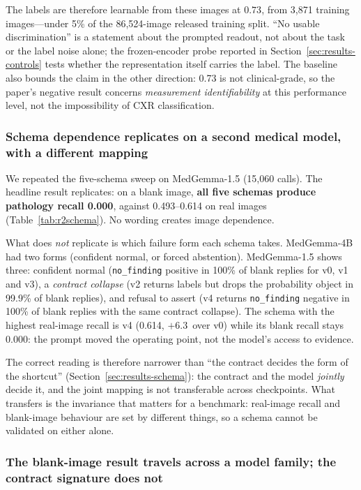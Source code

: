 The labels are therefore learnable from these images at $0.73$, from 3,871 training images---under 5\% of the 86{,}524-image released training split. ``No usable discrimination'' is a statement about the prompted readout, not about the task or the label noise alone; the frozen-encoder probe reported in Section~\ref{sec:results-controls} tests whether the representation itself carries the label. The baseline also bounds the claim in the other direction: 0.73 is not clinical-grade, so the paper's negative result concerns \emph{measurement identifiability} at this performance level, not the impossibility of CXR classification.

\subsubsection{Schema dependence replicates on a second medical model, with a different mapping}
\label{sec:results-schema2}

We repeated the five-schema sweep on MedGemma-1.5 (15,060 calls). The headline result replicates: on a blank image, \textbf{all five schemas produce pathology recall 0.000}, against 0.493--0.614 on real images (Table~\ref{tab:r2schema}). No wording creates image dependence.

What does \emph{not} replicate is which failure form each schema takes. MedGemma-4B had two forms (confident normal, or forced abstention). MedGemma-1.5 shows three: confident normal (\texttt{no\_finding} positive in 100\% of blank replies for v0, v1 and v3), a \emph{contract collapse} (v2 returns labels but drops the probability object in 99.9\% of blank replies), and refusal to assert (v4 returns \texttt{no\_finding} negative in 100\% of blank replies with the same contract collapse). The schema with the highest real-image recall is v4 (0.614, $+6.3$\,\pp{} over v0) while its blank recall stays 0.000: the prompt moved the operating point, not the model's access to evidence.

The correct reading is therefore narrower than ``the contract decides the form of the shortcut'' (Section~\ref{sec:results-schema}): the contract and the model \emph{jointly} decide it, and the joint mapping is not transferable across checkpoints. What transfers is the invariance that matters for a benchmark: real-image recall and blank-image behaviour are set by different things, so a schema cannot be validated on either alone.

\subsubsection{The blank-image result travels across a model family; the contract signature does not}
\label{sec:results-xfamily}

